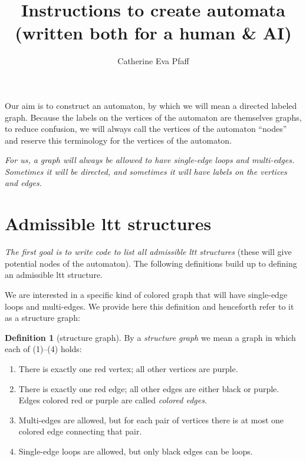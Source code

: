 \documentclass[11pt]{article}
\title{Instructions to create automata (written both for a human \& AI)}
\author{Catherine Eva Pfaff}
\date{}
\theoremstyle{definition}
\newtheorem{dfn}[thm]{Definition}
\begin{document}
\maketitle

\setcounter{tocdepth}{2}
\tableofcontents
\newpage

Our aim is to construct an automaton, by which we will mean a directed labeled graph. Because the labels on the vertices of the automaton are themselves graphs, to reduce confusion, we will always call the vertices of the automaton ``nodes'' and reserve this terminology for the vertices of the automaton.

\emph{For us, a graph will always be allowed to have single-edge loops and multi-edges. Sometimes it will be directed, and sometimes it will have labels on the vertices and edges.} 

\section*{Admissible ltt structures}
{}

\noindent\emph{The first goal is to write code to list all admissible ltt structures}
(these will give potential nodes of the automaton). The following definitions build up to defining an admissible ltt structure.

We are interested in a specific kind of colored graph that will have single-edge loops and multi-edges. We provide here this definition and henceforth refer to it as a structure graph:

\begin{dfn}[structure graph]\label{d:graph}
By a \emph{structure graph} we mean a graph in which each of (1)--(4) holds:
\begin{enumerate}[label=\arabic*)]
  \item There is exactly one red vertex; all other vertices are purple.
  \item There is exactly one red edge; all other edges are either black or purple.
        Edges colored red or purple are called \emph{colored edges}.
  \item Multi-edges are allowed, but for each pair of vertices there is at most one
        colored edge connecting that pair.
  \item Single-edge loops are allowed, but only black edges can be loops.
\end{enumerate}
\end{dfn}
\end{document}
